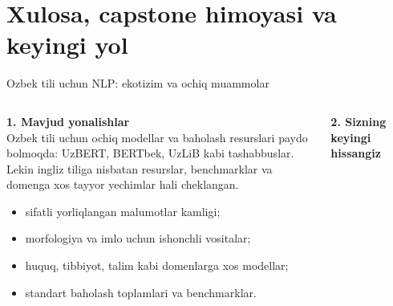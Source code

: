 \documentclass[aspectratio=169,11pt]{beamer}
\newcommand{\uzq}{\textquotesingle{}}   %
\begin{document}
\section[Xulosa]{Xulosa, capstone himoyasi va keyingi yo\uzq{}l}

\begin{frame}{O\uzq{}zbek tili uchun NLP: ekotizim va ochiq muammolar}
  \small
\vspace{-2mm}
  \begin{columns}[T,totalwidth=\textwidth]
    \begin{column}{0.50\textwidth}
      \textbf{1. Mavjud yo\uzq{}nalishlar}\\[3pt]

      O\uzq{}zbek tili uchun ochiq modellar va baholash resurslari paydo
      bo\uzq{}lmoqda: UzBERT, BERTbek, UzLiB kabi tashabbuslar.\\[4pt]

      Lekin ingliz tiliga nisbatan resurslar, benchmarklar va domenga xos
      tayyor yechimlar hali cheklangan.

      \vspace{-4pt}

      \begin{tcolorbox}[warnbox,title={Ochiq muammolar},top=2pt,bottom=2pt,boxsep=0.1mm]
        \footnotesize
        \begin{itemize}\setlength\itemsep{2pt}
          \item sifatli yorliqlangan ma\uzq{}lumotlar kamligi;
          \item morfologiya va imlo uchun ishonchli vositalar;
          \item huquq, tibbiyot, ta\uzq{}lim kabi domenlarga xos modellar;
          \item standart baholash to\uzq{}plamlari va benchmarklar.
        \end{itemize}
      \end{tcolorbox}
    \end{column}

    \begin{column}{0.46\textwidth}
      \textbf{2. Sizning keyingi hissangiz}\\[3pt]


\end{column}
\end{columns}
\end{frame}
\end{document}
